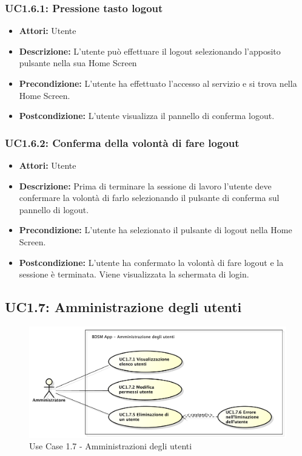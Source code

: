 \subsubsection{UC1.6.1: Pressione tasto logout}

\begin{itemize}
    \item \textbf{Attori:} Utente
    \item \textbf{Descrizione:} L'utente può effettuare il logout selezionando l'apposito pulsante nella sua Home Screen
    \item \textbf{Precondizione:} L'utente ha effettuato l'accesso al servizio e si trova nella Home Screen.
    \item \textbf{Postcondizione:} L'utente visualizza il pannello di conferma logout.
\end{itemize}

\subsubsection{UC1.6.2: Conferma della volontà di fare logout}

\begin{itemize}
    \item \textbf{Attori:} Utente
    \item \textbf{Descrizione:} Prima di terminare la sessione di lavoro l'utente deve confermare la volontà di farlo selezionando il pulsante di conferma sul pannello di logout.
    \item \textbf{Precondizione:} L'utente ha selezionato il pulsante di logout nella Home Screen.
    \item \textbf{Postcondizione:} L'utente ha confermato la volontà di fare logout e la sessione è terminata. Viene visualizzata la schermata di login.
\end{itemize}

\clearpage


\subsection{UC1.7: Amministrazione degli utenti}

\begin{figure}[!htbp]
    \centering
    \centerline{\includegraphics[scale=0.45]{./images/UC1_7.pdf}}
    \caption{Use Case 1.7 - Amministrazioni degli utenti}
\end{figure}


